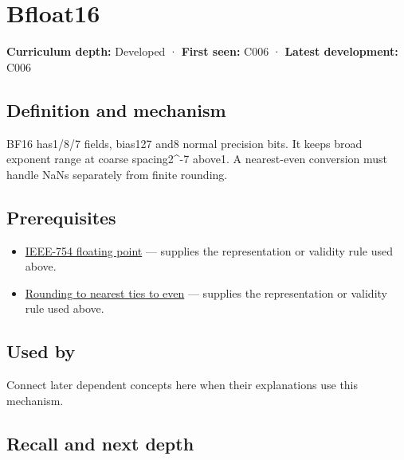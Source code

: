 \hypertarget{appendix-18b8dd966b5d}{}\label{referencestart:appendix-18b8dd966b5d}
\section{Bfloat16}\label{appendix-18b8dd966b5d-bfloat16}

\textbf{Curriculum depth:} Developed · \textbf{First seen:} C006 · \textbf{Latest development:} C006

\begin{allmightroledefinition}

\subsection{Definition and mechanism}\label{appendix-18b8dd966b5d-definition-and-mechanism}

BF16 has1/8/7 fields, bias127 and8 normal precision bits. It keeps broad exponent range at coarse spacing2\^{}-7 above1. A nearest-even conversion must handle NaNs separately from finite rounding.

\end{allmightroledefinition}

\subsection{Prerequisites}\label{appendix-18b8dd966b5d-prerequisites}

\begin{itemize}
\tightlist
\item
  \hyperref[appendix-343615f49ddf]{IEEE-754 floating point} --- supplies the representation or validity rule used above.
\item
  \hyperref[appendix-614afe1de592]{Rounding to nearest ties to even} --- supplies the representation or validity rule used above.
\end{itemize}

\subsection{Used by}\label{appendix-18b8dd966b5d-used-by}

Connect later dependent concepts here when their explanations use this mechanism.

\subsection{Recall and next depth}\label{appendix-18b8dd966b5d-recall-and-next-depth}

